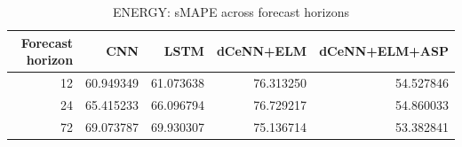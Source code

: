 \begin{table}
\caption{ENERGY: sMAPE across forecast horizons}
\begin{tabular}{rrrrr}
\toprule
Forecast horizon & CNN & LSTM & dCeNN+ELM & dCeNN+ELM+ASP \\
\midrule
12 & 60.949349 & 61.073638 & 76.313250 & 54.527846 \\
24 & 65.415233 & 66.096794 & 76.729217 & 54.860033 \\
72 & 69.073787 & 69.930307 & 75.136714 & 53.382841 \\
\bottomrule
\end{tabular}
\end{table}
